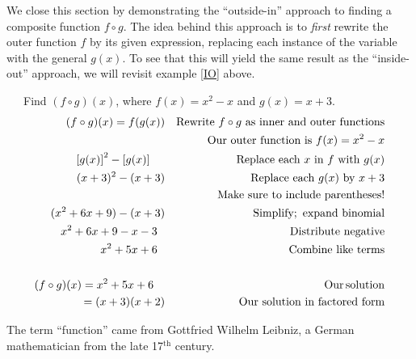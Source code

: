 We close this section by demonstrating the ``outside-in'' approach to finding a composite function $f\circ g$.  The idea behind this approach is to \textit{first} rewrite the outer function $f$ by its given expression, replacing each instance of the variable with the general $g(x)$.  To see that this will yield the same result as the ``inside-out'' approach, we will revisit example \ref{IO} above.

\begin{example}~~~Find $(f \circ g) (x)$, where $f (x) = x^2 - x$ and $g (x) = x + 3$.
  \begin{eqnarray*}
    (f \circ g) (x)=f (g (x)) &  & \text{Rewrite~} f\circ g \text{~as~inner~and~outer~functions}\\
	    &  & \text{Our~outer~function~is~} f(x) = x^2 - x\\
    \left[g(x)\right]^2-\left[g(x)\right]~~~~ &  & \text{Replace~each~} x \text{~in~} f \text{~with~} g(x)\\
		 (x + 3)^2 - (x + 3) &  & \text{Replace~each~} g(x) \text{~by~} x+3\\
		& & \text{Make~sure~to~include~parentheses!}\\
    (x^2 + 6 x + 9) - (x + 3)  &  & \operatorname{Simplify;~expand~binomial}\\
    x^2 + 6 x + 9 - x - 3~~ &  & \operatorname{Distribute~negative}\\
    x^2 + 5 x + 6~~ &  & \operatorname{Combine~like~terms}\\
    & & \\
		(f \circ g) (x)=x^2 + 5 x + 6~~~ &  & \operatorname{Our} \operatorname{solution}\\
		=(x+3)(x+2) & & \text{Our~solution~in~factored~form}
  \end{eqnarray*}
\end{example}


{} The term ``function'' came from Gottfried Wilhelm
Leibniz, a German mathematician from the late 17$^{\text{th}}$ century.

	
	
	
	
